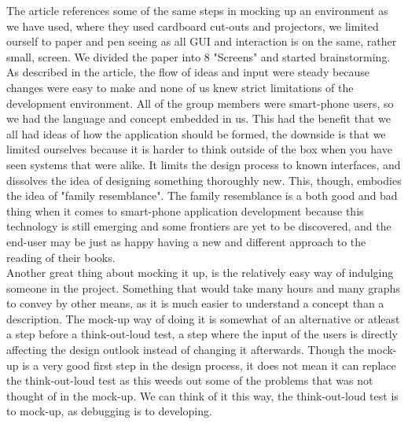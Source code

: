 \message{ !name(Rapport.tex)}\documentclass[12pt]{article}
\begin{document}
The article references some of the same steps in mocking up an environment as we have used, where they used cardboard cut-outs and projectors, we limited ourself to paper and pen seeing as all GUI and interaction is on the same, rather small, screen. We divided the paper into 8 "Screens" and started brainstorming. As described in the article, the flow of ideas and input were steady because changes were easy to make and none of us knew strict limitations of the development environment. All of the group members were smart-phone users, so we had the language and concept embedded in us. This had the benefit that we all had ideas of how the application should be formed, the downside is that we limited ourselves because it is harder to think outside of the box when you have seen systems that were alike. It limits the design process to known interfaces, and dissolves the idea of designing something thoroughly new. This, though, embodies the idea of "family resemblance". The family resemblance is a both good and bad thing when it comes to smart-phone application development because this technology is still emerging and some frontiers are yet to be discovered, and the end-user may be just as happy having a new and different approach to the reading of their books.\\
Another great thing about mocking it up, is the relatively easy way of indulging someone in the project. Something that would take many hours and many graphs to convey by other means, as it is much easier to understand a concept than a description. The mock-up way of doing it is somewhat of an alternative or atleast a step before a think-out-loud test, a step where the input of the users is directly affecting the design outlook instead of changing it afterwards. Though the mock-up is a very good first step in the design process, it does not mean it can replace the think-out-loud test as this weeds out some of the problems that was not thought of in the mock-up. We can think of it this way, the think-out-loud test is to mock-up, as debugging is to developing.

\newpage
\end{document}
